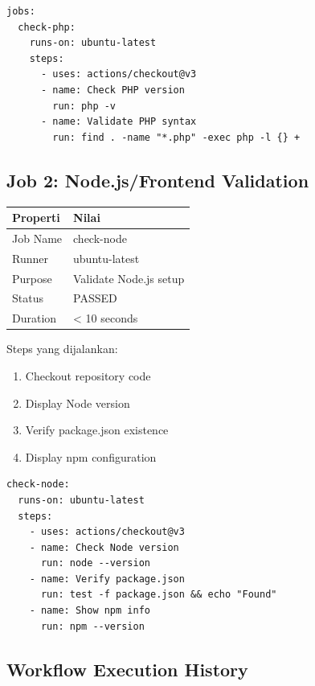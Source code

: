 \documentclass[a4paper,oneside,11pt]{book}
\begin{document}
\begin{lstlisting}[style=yamlStyle, caption={PHP Syntax Check Job}, label={kode:phpjob}]
jobs:
  check-php:
    runs-on: ubuntu-latest
    steps:
      - uses: actions/checkout@v3
      - name: Check PHP version
        run: php -v
      - name: Validate PHP syntax
        run: find . -name "*.php" -exec php -l {} +
\end{lstlisting}

\subsection{Job 2: Node.js/Frontend Validation}

\begin{center}
\begin{tabular}{|l|l|}
\hline
\textbf{Properti} & \textbf{Nilai} \\
\hline
Job Name & check-node \\
\hline
Runner & ubuntu-latest \\
\hline
Purpose & Validate Node.js setup \\
\hline
Status & PASSED \\
\hline
Duration & < 10 seconds \\
\hline
\end{tabular}
\end{center}

Steps yang dijalankan:
\begin{enumerate}
    \item Checkout repository code
    \item Display Node version
    \item Verify package.json existence
    \item Display npm configuration
\end{enumerate}

\begin{lstlisting}[style=yamlStyle, caption={Node.js Check Job}, label={kode:nodejob}]
check-node:
  runs-on: ubuntu-latest
  steps:
    - uses: actions/checkout@v3
    - name: Check Node version
      run: node --version
    - name: Verify package.json
      run: test -f package.json && echo "Found"
    - name: Show npm info
      run: npm --version
\end{lstlisting}

\subsection{Workflow Execution History}
\end{document}

